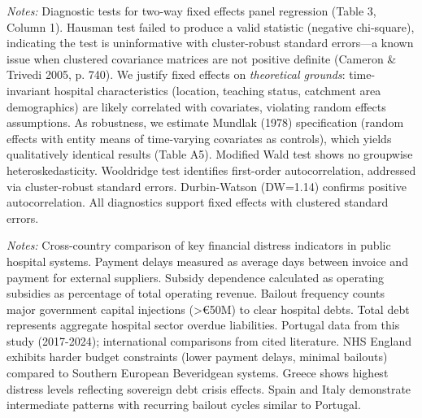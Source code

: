 \documentclass[12pt,oneside]{article}
\begin{document}
\begin{table}[htbp]
\centering
\caption{Panel Regression Diagnostic Tests}
\label{tab:panel_diagnostics}
\footnotesize
\begin{threeparttable}

\begin{tablenotes}
\small
\item \textit{Notes:} Diagnostic tests for two-way fixed effects panel regression (Table 3, Column 1). Hausman test failed to produce a valid statistic (negative chi-square), indicating the test is uninformative with cluster-robust standard errors—a known issue when clustered covariance matrices are not positive definite (Cameron \& Trivedi 2005, p. 740). We justify fixed effects on \textit{theoretical grounds}: time-invariant hospital characteristics (location, teaching status, catchment area demographics) are likely correlated with covariates, violating random effects assumptions. As robustness, we estimate Mundlak (1978) specification (random effects with entity means of time-varying covariates as controls), which yields qualitatively identical results (Table A5). Modified Wald test shows no groupwise heteroskedasticity. Wooldridge test identifies first-order autocorrelation, addressed via cluster-robust standard errors. Durbin-Watson (DW=1.14) confirms positive autocorrelation. All diagnostics support fixed effects with clustered standard errors.
\end{tablenotes}
\end{threeparttable}
\end{table}

\begin{table}[htbp]
\centering
\caption{Cross-Country Comparison: Hospital Financial Distress Indicators}
\label{tab:cross_country}
\footnotesize
\begin{threeparttable}

\begin{tablenotes}
\small
\item \textit{Notes:} Cross-country comparison of key financial distress indicators in public hospital systems. Payment delays measured as average days between invoice and payment for external suppliers. Subsidy dependence calculated as operating subsidies as percentage of total operating revenue. Bailout frequency counts major government capital injections (>€50M) to clear hospital debts. Total debt represents aggregate hospital sector overdue liabilities. Portugal data from this study (2017-2024); international comparisons from cited literature. NHS England exhibits harder budget constraints (lower payment delays, minimal bailouts) compared to Southern European Beveridgean systems. Greece shows highest distress levels reflecting sovereign debt crisis effects. Spain and Italy demonstrate intermediate patterns with recurring bailout cycles similar to Portugal.
\end{tablenotes}
\end{threeparttable}
\end{table}
\end{document}

